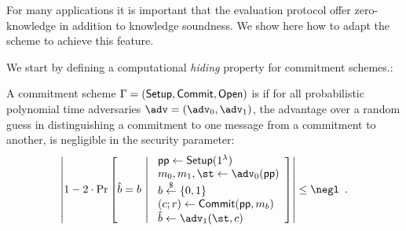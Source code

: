 For many applications it is important that the evaluation protocol offer zero-knowledge in addition to knowledge soundness. We show here how to adapt the scheme to achieve this feature.

We start by defining a computational \emph{hiding} property for commitment schemes.:

\begin{definition}
A commitment scheme $\Gamma = (\textsf{{Setup}}, \textsf{{Commit}}, \textsf{{Open}})$ is  if for all probabilistic polynomial time adversaries $\adv = (\adv_0, \adv_1)$, the advantage over a random guess in distinguishing a commitment to one message from a commitment to another, is negligible in the security parameter:
\[
	\left| 1 - 2 \cdot \mathrm{Pr}\left[
		\hat{b} = b \ \middle| \ 
		\begin{array}{l}
			\params \gets \pro{Setup}(1^\lambda) \\
			m_0, m_1, \st \gets \adv_0(\params) \\
			b \sample \{0,1\} \\
			(c; r) \gets \pro{Commit}(\params, m_b) \\
			\hat{b} \gets \adv_1(\st, c)
		\end{array}
	\right] \right| \leq \negl \enspace .
\]
\end{definition}

